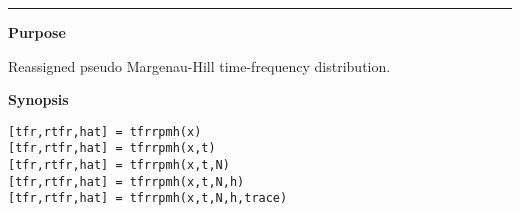 

\hspace*{-1.6cm}{\Large \bf tfrrpmh}

\vspace*{-.4cm}
\hspace*{-1.6cm}\rule[0in]{16.5cm}{.02cm}
\vspace*{.2cm}

{\bf \large {}\selectfont Purpose}\\
\hspace*{1.5cm}
\begin{minipage}[t]{13.5cm}
Reassigned pseudo Margenau-Hill time-frequency distribution.
\end{minipage}
\vspace*{.5cm}

{\bf \large {}\selectfont Synopsis}\\
\hspace*{1.5cm}
\begin{minipage}[t]{13.5cm}
\begin{verbatim}
[tfr,rtfr,hat] = tfrrpmh(x) 
[tfr,rtfr,hat] = tfrrpmh(x,t) 
[tfr,rtfr,hat] = tfrrpmh(x,t,N) 
[tfr,rtfr,hat] = tfrrpmh(x,t,N,h) 
[tfr,rtfr,hat] = tfrrpmh(x,t,N,h,trace) 
\end{verbatim}
\end{minipage}
\vspace*{.5cm}

